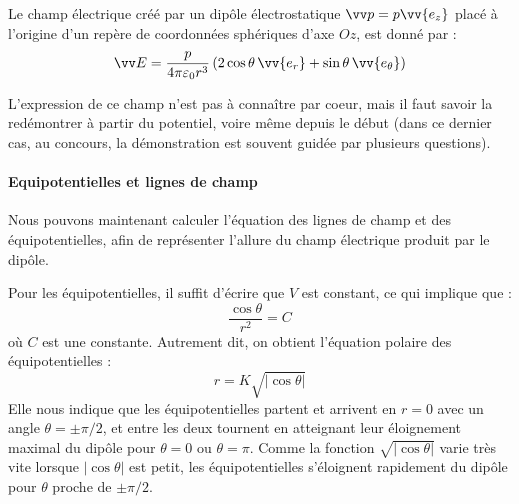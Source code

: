 \documentclass[11pt,fleqn]{book} %
\begin{document}
\begin{proposition}
Le champ électrique créé par un dipôle électrostatique $\vv p = p \vv{e_z}$ placé à l'origine d'un repère de coordonnées sphériques d'axe $Oz$, est donné par :
\begin{equation}
\vv E = \frac{p}{4 \pi \varepsilon_0 r^3} \left( 2 \cos \theta \, \vv{e_r} + \sin \theta \, \vv{e_\theta}  \right)
\end{equation}
\end{proposition}

\begin{remark}
    L'expression de ce champ n'est pas à connaître par coeur, mais il faut savoir la redémontrer à partir du potentiel, voire même depuis le début (dans ce dernier cas, au concours, la démonstration est souvent guidée par plusieurs questions).
\end{remark}

\paragraph{Equipotentielles et lignes de champ}

Nous pouvons maintenant calculer l'équation des lignes de champ et des équipotentielles, afin de représenter l'allure du champ électrique produit par le dipôle. 

Pour les équipotentielles, il suffit d'écrire que $V$ est constant, ce qui implique que :
\begin{equation}
    \frac{\cos \theta}{r^2} = C
\end{equation}
où $C$ est une constante. Autrement dit, on obtient l'équation polaire des équipotentielles :
\begin{equation}
    r = K \sqrt{|\cos \theta|}
\end{equation}
Elle nous indique que les équipotentielles partent et arrivent en $r=0$ avec un angle $\theta = \pm \pi/2$, et entre les deux tournent en atteignant leur éloignement maximal du dipôle pour $\theta = 0$ ou $\theta = \pi$. Comme la fonction $\sqrt{|\cos \theta|}$ varie très vite lorsque $|\cos \theta|$ est petit, les équipotentielles s'éloignent rapidement du dipôle pour $\theta$ proche de $\pm \pi/2$.
\end{document}
